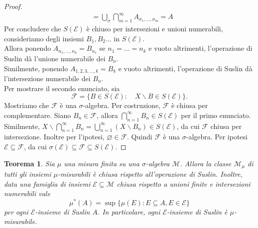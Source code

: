 \documentclass[a4paper, twoside]{article}
\newcommand{\<}{\langle}
\renewcommand{\>}{\rangle}
\newtheorem{teo}{Teorema}[]
\begin{document}
\begin{proof}
$$\begin{aligned}
		&=\bigcup_{\sigma} \bigcap_{m=1}^{\infty} A_{\sigma_{1}, \ldots, \sigma_{m}}=A
	\end{aligned}
	$$
	Per concludere che $S(\mathcal{E})$ è chiuso per intersezioni e unioni numerabili, consideriamo degli insiemi $B_1, B_2...$ in $S(\mathcal{E})$.\\
	Allora ponendo $A_{n_1,...,n_k}=B_{n_1}$ se $n_1=...=n_k$ e vuoto altrimenti, l'operazione di Suslin dà l'unione numerabile dei $B_n$.\\
	Similmente, ponendo $A_{1,2,3,...,k}=B_{k}$ e vuoto altrimenti,  l'operazione di Suslin dà l'intersezione numerabile dei $B_n$.\\
	Per mostrare il secondo enunciato, sia
	$$
	\mathcal{F}=\{B \in S(\mathcal{E}): \quad X \backslash B \in S(\mathcal{E})\} .
	$$
	Mostriamo che $\mathcal{F}$ è una $\sigma$-algebra. Per costruzione, $\mathcal{F}$ è chiusa per complementare. Siano $B_{n} \in \mathcal{F}$, allora $\bigcap_{n=1}^{\infty} B_{n} \in S(\mathcal{E})$ per il primo enunciato. Similmente, $X \backslash \bigcap_{n=1}^{\infty} B_{n}=\bigcup_{n=1}^{\infty}\left(X \backslash B_{n}\right) \in S(\mathcal{E})$, da cui $\mathcal{F}$ chiusa per intersezione. Inoltre per l'ipotesi, $\varnothing \in \mathcal{F}$. Quindi $\mathcal{F}$ è una $\sigma$-algebra. Per ipotesi $\mathcal{E} \subseteq \mathcal{F}$, da cui $\sigma(\mathcal{E}) \subseteq \mathcal{F} \subseteq S(\mathcal{E})$.
\end{proof}



\begin{teo} \label{misurab}
	Sia $\mu$ una misura finita su una $\sigma$-algebra $\mathcal{M}$. Allora la classe $\mathcal{M}_{\mu}$ di tutti gli insiemi $\mu$-misurabili è chiusa rispetto all'operazione di Suslin. Inoltre, data una famiglia di insiemi $\mathcal{E} \subseteq \mathcal{M}$ chiusa rispetto a unioni finite e intersezioni numerabili vale
	$$
	\mu^{*}(A)=\sup \{\mu(E): E \subseteq A, E \in \mathcal{E}\}
	$$
	per ogni $\mathcal{E}$-insieme di Suslin $A$. In particolare, ogni $\mathcal{E}$-insieme di Suslin è $\mu$-misurabile.
\end{teo}
\end{document}
